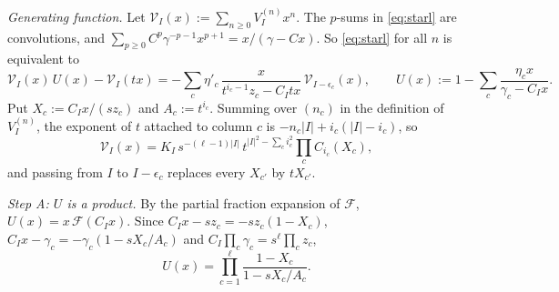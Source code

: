 \documentclass[11pt]{amsart}
\theoremstyle{definition}
\theoremstyle{remark}
\numberwithin{equation}{section}
\begin{document}
\emph{Generating function.} Let $\mathcal V_I(x):=\sum_{n\ge0}V^{(n)}_Ix^n$. The $p$-sums in \eqref{eq:starl} are convolutions, and $\sum_{p\ge0}C^p\gamma^{-p-1}x^{p+1}=x/(\gamma-Cx)$. So \eqref{eq:starl} for all $n$ is equivalent to
\begin{equation}\label{eq:starlGF}
\mathcal V_I(x)\,U(x)-\mathcal V_I(tx)=-\sum_c\eta'_c\,\frac{x}{t^{i_c-1}z_c-C_Itx}\,\mathcal V_{I-\epsilon_c}(x),\qquad U(x):=1-\sum_c\frac{\eta_cx}{\gamma_c-C_Ix}.
\end{equation}
Put $X_c:=C_Ix/(sz_c)$ and $A_c:=t^{i_c}$. Summing over $(n_c)$ in the definition of $V^{(n)}_I$, the exponent of $t$ attached to column $c$ is $-n_c|I|+i_c(|I|-i_c)$, so
\begin{equation}\label{eq:VGF}
\mathcal V_I(x)=K_I\,s^{-(\ell-1)|I|}\,t^{|I|^2-\sum_ci_c^2}\prod_cC_{i_c}(X_c),
\end{equation}
and passing from $I$ to $I-\epsilon_c$ replaces every $X_{c'}$ by $tX_{c'}$.

\emph{Step A: $U$ is a product.} By the partial fraction expansion of $\mathcal F$, $U(x)=x\,\mathcal F(C_Ix)$. Since $C_Ix-sz_c=-sz_c(1-X_c)$, $C_Ix-\gamma_c=-\gamma_c(1-sX_c/A_c)$ and $C_I\prod_c\gamma_c=s^\ell\prod_cz_c$,
\[ U(x)=\prod_{c=1}^\ell\frac{1-X_c}{1-sX_c/A_c}. \]
\end{document}
